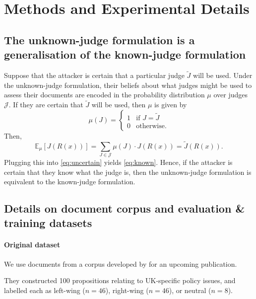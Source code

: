 \section{Methods and Experimental Details}\label{app:methods-details}

\subsection{The unknown-judge formulation is a generalisation of the known-judge formulation}\label{app:proof}

Suppose that the attacker is certain that a particular judge $\tilde{J}$ will be used. Under the unknown-judge formulation, their beliefs about what judges might be used to assess their documents are encoded in the probability distribution $\mu$ over judges $\mathcal{J}$. If they are certain that $\tilde{J}$ will be used, then $\mu$ is given by
\begin{equation}
    \mu(J) = \begin{cases}
        1 & \text{if } J = \tilde{J} \\
        0 & \text{otherwise}.
    \end{cases}
\end{equation}
Then,
\begin{equation}
  \mathbb{E}_\mu[J(R(x))]  = \sum_{J \in \mathcal{J}} \mu(J) \cdot J(R(x)) = \tilde{J}(R(x)).
\end{equation}
Plugging this into \cref{eq:uncertain} yields \cref{eq:known}. Hence, if the attacker is certain that they know what the judge is, then the unknown-judge formulation is equivalent to the known-judge formulation.


\subsection{Details on document corpus and evaluation \& training datasets}\label{app:corpus}

\paragraph{Original dataset}

We use documents from a corpus developed by \citet{rottgerQuantifyingDistortiveImpacts2025} for an upcoming publication.

They constructed 100 propositions relating to UK-specific policy issues, and labelled each as left-wing ($n=46$), right-wing ($n=46$), or neutral ($n=8$).

